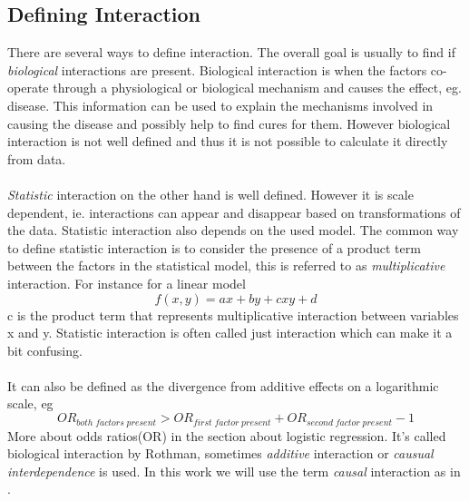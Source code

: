 \documentclass[10pt,a4paper]{article}
\begin{document}

\subsection{Defining Interaction}
There are several ways to define interaction. The overall goal is usually to find if \emph{biological} interactions are present. Biological interaction is when the factors co-operate through a physiological or biological mechanism and causes the effect, eg. disease. This information can be used to explain the mechanisms involved in causing the disease and possibly help to find cures for them. However biological interaction is not well defined and thus it is not possible to calculate it directly from data.\cite{rothman1998modern,rothman2002intro_epidemiology}\\
\\
\emph{Statistic} interaction on the other hand is well defined. However it is scale dependent, ie. interactions can appear and disappear based on transformations of the data. Statistic interaction also depends on the used model. The common way to define statistic interaction is to consider the presence of a product term between the factors in the statistical model, this is referred to as \emph{multiplicative} interaction. For instance for a linear model
$$f(x,y)=ax+by+cxy+d$$
c is the product term that represents multiplicative interaction between variables x and y. Statistic interaction is often called just interaction which can make it a bit confusing.\cite{geira,rothman1998modern}\\
\\
It can also be defined as the divergence from additive effects on a logarithmic scale, eg
$$OR_{both\;factors\;present}>OR_{first\;factor\;present}+OR_{second\;factor\;present}-1$$
More about odds ratios(OR) in the section about logistic regression. It's called biological interaction by Rothman\cite{rothman1998modern}, sometimes \emph{additive} interaction\cite{geira} or \emph{causual interdependence}\cite{greenland1988invariants} is used. In this work we will use the term \emph{causal} interaction as in \cite{causal_bounds_arvid}.\\
\end{document}
